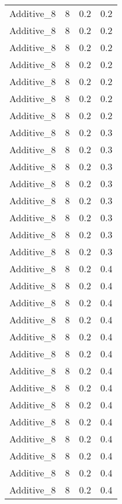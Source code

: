 \documentclass{article}
\begin{document}
\begin{longtable}[H]{lrrr}
 Additive\_8 &       8 &   0.2 &            0.2 \\
 Additive\_8 &       8 &   0.2 &            0.2 \\
 Additive\_8 &       8 &   0.2 &            0.2 \\
 Additive\_8 &       8 &   0.2 &            0.2 \\
 Additive\_8 &       8 &   0.2 &            0.2 \\
 Additive\_8 &       8 &   0.2 &            0.2 \\
 Additive\_8 &       8 &   0.2 &            0.2 \\
 Additive\_8 &       8 &   0.2 &            0.3 \\
 Additive\_8 &       8 &   0.2 &            0.3 \\
 Additive\_8 &       8 &   0.2 &            0.3 \\
 Additive\_8 &       8 &   0.2 &            0.3 \\
 Additive\_8 &       8 &   0.2 &            0.3 \\
 Additive\_8 &       8 &   0.2 &            0.3 \\
 Additive\_8 &       8 &   0.2 &            0.3 \\
 Additive\_8 &       8 &   0.2 &            0.3 \\
 Additive\_8 &       8 &   0.2 &            0.4 \\
 Additive\_8 &       8 &   0.2 &            0.4 \\
 Additive\_8 &       8 &   0.2 &            0.4 \\
 Additive\_8 &       8 &   0.2 &            0.4 \\
 Additive\_8 &       8 &   0.2 &            0.4 \\
 Additive\_8 &       8 &   0.2 &            0.4 \\
 Additive\_8 &       8 &   0.2 &            0.4 \\
 Additive\_8 &       8 &   0.2 &            0.4 \\
 Additive\_8 &       8 &   0.2 &            0.4 \\
 Additive\_8 &       8 &   0.2 &            0.4 \\
 Additive\_8 &       8 &   0.2 &            0.4 \\
 Additive\_8 &       8 &   0.2 &            0.4 \\
 Additive\_8 &       8 &   0.2 &            0.4 \\
 Additive\_8 &       8 &   0.2 &            0.4 \\

\end{longtable}
\end{document}

